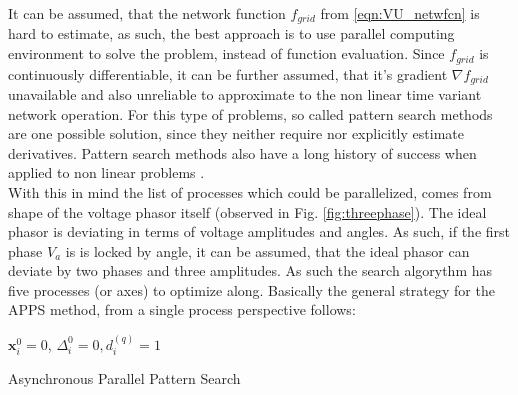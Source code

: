         It can be assumed, that the network function $f_{grid}$ from \ref{eqn:VU_netwfcn} is hard to estimate, as such, the best approach is to use parallel computing environment to solve the problem, instead of function evaluation. Since $f_{grid}$ is continuously differentiable, it can be further assumed, that it's gradient $\nabla f_{grid}$ unavailable and also unreliable to approximate to the non linear time variant network operation. For this type of problems, so called pattern search methods are one possible solution, since they neither require nor explicitly estimate derivatives.  Pattern search methods also have a long history of success when applied to non linear problems \cite{hough2001asynchronous}.\\
        With this in mind the list of processes which could be parallelized, comes from shape of the voltage phasor itself (observed in Fig. \ref{fig:threephase}). The ideal phasor is deviating in terms of voltage amplitudes and angles. As such, if the first phase $V_a$ is is locked by angle, it can be assumed, that the ideal phasor can deviate by two phases and three amplitudes. As such the search algorythm has five processes (or axes) to optimize along. Basically the general strategy for the APPS method, from a single process perspective follows: %
        \begin{algorithm}[H]
        \SetAlgoLined
         $\textbf{x}_i^0=0$, $\Delta_i^0=0, d_i^{(q)}=1$\;
         \caption{Asynchronous Parallel Pattern Search}
         \label{algo:APPS}
        \end{algorithm}

